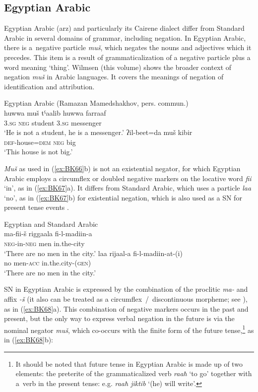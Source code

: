 \documentclass[output=paper]{langsci/langscibook}
\begin{document}
\subsection{Egyptian Arabic}\label{sec:BK4.3}

Egyptian Arabic (arz) and particularly its Cairene dialect differ from Standard Arabic in several domains of grammar, including negation. In Egyptian Arabic, there is a negative particle \textit{muš}, which negates the nouns and adjectives which it precedes. This item is a result of grammaticalization of a negative particle plus a word meaning ‘thing’. Wilmsen (this volume) shows the broader context of negation \textit{muš} in Arabic languages. It covers the meanings of negation of identification and attribution.

\ea Egyptian Arabic (Ramazan Mamedshakhov, pers. commun.) \label{ex:BK66}\\
  \ea
	\gll huwwa	muš	tˤaalib	huwwa	farraaf\\
	\textsc{3.sg}		\textsc{neg}	student	\textsc{3.sg}		messenger\\
	\glt `He is not a student, he is a messenger.'
  \ex
	\gll ʔil-beet=da			muš	kibir\\
	\textsc{def}-house=\textsc{dem}	\textsc{neg}	big\\
	\glt `This house is not big.'
\z \z

\textit{Muš} as used in (\ref{ex:BK66}b) is not an existential negator, for which Egyptian Arabic employs a circumflex or doubled negative markers on the locative word \textit{fii} ‘in’, as in (\ref{ex:BK67}a). It differs from Standard Arabic, which uses a particle \textit{laa} ‘no’, as in (\ref{ex:BK67}b) for existential negation, which is also used as a SN for present tense events \citep[232]{gadalla2000a}.

\ea Egyptian and Standard Arabic \citep[234]{gadalla2000a} \label{ex:BK67}\\
  \ea
	\gll ma-fii-š		riggaala		fi-l-madiin-a\\
	\textsc{neg}-in-\textsc{neg}	men			in.the-city\\
	\glt `There are no men in the city.'
  \ex
	\gll laa	rijaal-a		fi-l-madiin-at-(i)\\
	no		men-\textsc{acc}	in.the.city-(\textsc{gen})\\
	\glt `There are no men in the city.'
\z \z

SN in Egyptian Arabic is expressed by the combination of the proclitic \textit{ma-} and affix \textit{-š} (it also can be treated as a circumflex / discontinuous morpheme; see \citealp[234]{gadalla2000a}), as in (\ref{ex:BK68}a). This combination of negative markers occurs in the past and present, but the only way to express verbal negation in the future is via the nominal negator \textit{muš}, which co-occurs with the finite form of the future tense,\footnote{It should be noted that future tense in Egyptian Arabic is made up of two elements: the preterite of the grammaticalized verb \textit{raaħ} ‘to go’ together with a verb in the present tense: e.g. \textit{raaħ jiktib} ‘(he) will write’.} as in (\ref{ex:BK68}b):
\end{document}
